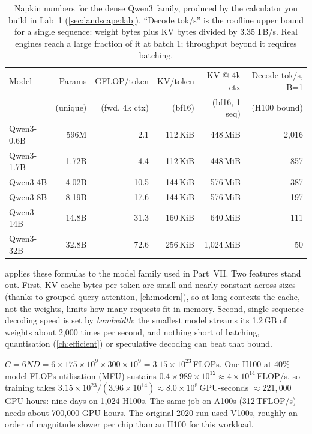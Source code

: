 \begin{table}[t]
\centering\small
\begin{tabular}{lrrrrr}
\toprule
Model & Params & GFLOP/token & KV/token & KV @ 4k ctx & Decode tok/s, B=1\\
 & (unique) & (fwd, 4k ctx) & (bf16) & (bf16, 1 seq) & (H100 bound)\\
\midrule
Qwen3-0.6B & 596M & 2.1 & 112\,KiB & 448\,MiB & 2{,}016\\
Qwen3-1.7B & 1.72B & 4.4 & 112\,KiB & 448\,MiB & 857\\
Qwen3-4B & 4.02B & 10.5 & 144\,KiB & 576\,MiB & 387\\
Qwen3-8B & 8.19B & 17.6 & 144\,KiB & 576\,MiB & 197\\
Qwen3-14B & 14.8B & 31.3 & 160\,KiB & 640\,MiB & 111\\
Qwen3-32B & 32.8B & 72.6 & 256\,KiB & 1{,}024\,MiB & 50\\
\bottomrule
\end{tabular}
\caption{Napkin numbers for the dense Qwen3 family, produced by the calculator you build in Lab~1
(\cref{sec:landscape:lab}). ``Decode tok/s'' is the roofline upper bound for a single sequence:
weight bytes plus KV bytes divided by 3.35\,TB/s. Real engines reach a large fraction of it at batch 1;
throughput beyond it requires batching.}
\label{tab:landscape:qwen3napkin}
\end{table}

 applies these formulas to the model family used in Part~VII. Two features
stand out. First, KV-cache bytes per token are small and nearly constant across sizes (thanks to
grouped-query attention, \cref{ch:modern}), so at long contexts the cache, not the weights, limits how many
requests fit in memory. Second, single-sequence decoding speed is set by \emph{bandwidth}: the smallest
model streams its 1.2\,GB of weights about 2{,}000 times per second, and nothing short of batching,
quantisation (\cref{ch:efficient}) or speculative decoding can beat that bound.

\begin{napkinmath}
$C = 6ND = 6\times175\times10^9\times300\times10^9 = 3.15\times10^{23}$\,FLOPs. One H100 at 40\% model
FLOPs utilisation (MFU) sustains $0.4\times989\times10^{12} \approx 4\times10^{14}$\,FLOP/s, so training takes
$3.15\times10^{23}/(3.96\times10^{14}) \approx 8.0\times10^8$\,GPU-seconds $\approx 221{,}000$ GPU-hours: nine days on
1{,}024 H100s. The same job on A100s (312\,TFLOP/s) needs about 700{,}000 GPU-hours. The original 2020
run used V100s, roughly an order of magnitude slower per chip than an H100 for this workload.
\end{napkinmath}

